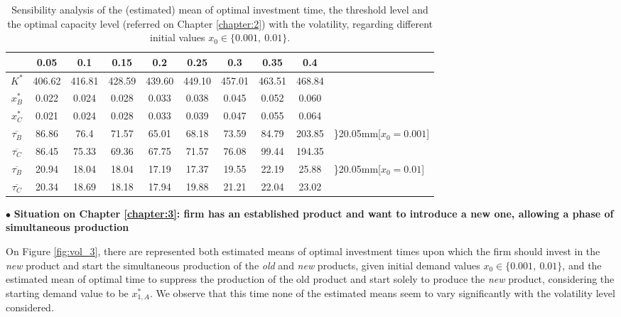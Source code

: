 \begin{table}[!ht]
	\centering
	\caption{Sensibility analysis of the (estimated) mean of optimal investment time, the threshold level and the optimal capacity level (referred on Chapter \ref{chapter:2}) with the volatility, regarding different initial values $x_0 \in \{0.001, \ 0.01\}$.}
	\begin{tabular}{c|ccccccccl}
		\hline
		\text{ $\sigma $ } & 0.05 & 0.1 & 0.15 & 0.2 & 0.25 & 0.3 & 0.35 & 0.4 \\ \hline
		$K^*$ & 406.62 & 416.81 & 428.59 & 439.60 & 449.10 & 457.01 & 463.51 & 468.84  \\
		$x_B^*$ & 0.022 & 0.024 & 0.028 & 0.033 & 0.038 & 0.045 & 0.052 & 0.060  \\
		$x_C^*$ & 0.021 & 0.024 & 0.028 & 0.033 & 0.039 & 0.047 & 0.055 & 0.064 \\ \hline
		$\overline{\tau _B}$ & 86.86 & 76.4 & 71.57 & 65.01 & 68.18 & 73.59 & 84.79 & 203.85  & \rdelim\}{2}{0.05mm}[$x_0=0.001$]  \\
		$\overline{\tau _C}$ & 86.45 & 75.33 & 69.36 & 67.75 & 71.57 & 76.08 & 99.44 & 194.35 \\ \hline
		$\overline{\tau _B}$ & 20.94 & 18.04 & 18.04 & 17.19 & 17.37 & 19.55 & 22.19 & 25.88  &	\rdelim\}{2}{0.05mm}[$x_0=0.01$] \\
		$\overline{\tau _C}$ & 20.34 & 18.69 & 18.18 & 17.94 & 19.88 & 21.21 & 22.04 & 23.02  \\ \hline
	\end{tabular}
\label{tab:vol_2}
\end{table}






$\bullet$ \textbf{Situation on Chapter \ref{chapter:3}: firm has an established product and want to introduce a new one, allowing a phase of simultaneous production}


On Figure \ref{fig:vol_3}, there are represented both estimated means of optimal investment times upon which the firm should invest in the \textit{new} product and start the simultaneous production of the \textit{old} and \textit{new} products, given initial demand values $x_0 \in \{ 0.001, \ 0.01 \}$, and the estimated mean of optimal time to suppress the production of the old product and start solely to produce the \textit{new} product, considering the starting demand value to be $x_{1,A}^*$. We observe that this time none of the estimated means seem to vary significantly with the volatility level considered.


